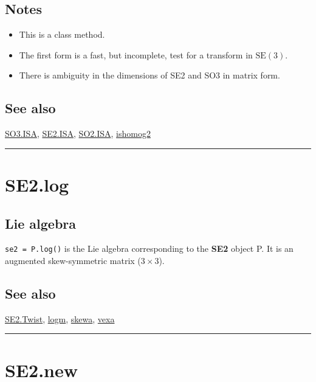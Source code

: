 \subsection*{Notes}
\begin{itemize}
  \item This is a class method.
  \item The first form is a fast, but incomplete, test for a transform in $\mbox{SE}(3)$.
  \item There is ambiguity in the dimensions of SE2 and SO3 in matrix form.
\end{itemize}

\subsection*{See also}


\hyperlink{SO3.ISA}{\color{blue} SO3.ISA}, \hyperlink{SE2.ISA}{\color{blue} SE2.ISA}, \hyperlink{SO2.ISA}{\color{blue} SO2.ISA}, \hyperlink{ishomog2}{\color{blue} ishomog2}

\vspace{1.5ex}\hrule

\hypertarget{SE2.log}{\section*{SE2.log}}
\subsection*{Lie algebra}


\texttt{se2 = P.log()} is the Lie algebra corresponding to the \textbf{\color{red} SE2} object P. It is
an augmented skew-symmetric matrix ($3 \times 3$).


\subsection*{See also}


\hyperlink{SE2.Twist}{\color{blue} SE2.Twist}, \hyperlink{logm}{\color{blue} logm}, \hyperlink{skewa}{\color{blue} skewa}, \hyperlink{vexa}{\color{blue} vexa}

\vspace{1.5ex}\hrule

\hypertarget{SE2.new}{\section*{SE2.new}}
